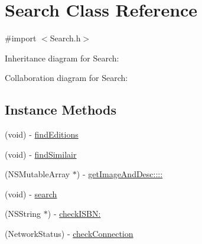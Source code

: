 \hypertarget{interface_search}{}\section{Search Class Reference}
\label{interface_search}


{\ttfamily \#import $<$Search.\+h$>$}



Inheritance diagram for Search\+:


Collaboration diagram for Search\+:
\subsection*{Instance Methods}
\begin{DoxyCompactItemize}
\item 
(void) -\/ \hyperlink{interface_search_af8514e0651d63b7c09faefddb6757dea}{find\+Editions}
\item 
(void) -\/ \hyperlink{interface_search_a6978268d6c1d71fe36aca04cf6c190f6}{find\+Similair}
\item 
(N\+S\+Mutable\+Array $\ast$) -\/ \hyperlink{interface_search_aa96064736366ce2b85499d0e3800b348}{get\+Image\+And\+Desc\+::::}
\item 
(void) -\/ \hyperlink{interface_search_ae5e5f19a4e800c76823c0781d3cad215}{search}
\item 
(N\+S\+String $\ast$) -\/ \hyperlink{interface_search_aa221a1145cdaf40c008f25c8ba795e92}{check\+I\+S\+B\+N\+:}
\item 
(Network\+Status) -\/ \hyperlink{interface_search_a296ad648ed932881f08849d95a5d5c95}{check\+Connection}
\end{DoxyCompactItemize}
